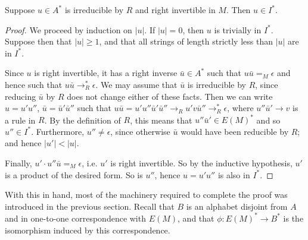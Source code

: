 \documentclass[noindex,noinsetproof,12pt]{lmaths}
\begin{document}
\begin{lemma}
	Suppose $u \in A^*$ is irreducible by $R$ and right invertible in $M$. Then $u \in I^*$. \label{lma:factor-I*}
\end{lemma}
\begin{proof}
	We proceed by induction on $|u|$. If $|u| = 0$, then $u$ is trivially in $I^*$. Suppose then that $|u| \ge 1$, and that all strings of length strictly less than $|u|$ are in $I^*$.

	Since $u$ is right invertible, it has a right inverse $\bar u \in A^*$ such that $u\bar u =_M \epsilon$ and hence such that $u\bar u \to_R^* \epsilon$. We may assume that $\bar u$ is irreducible by $R$, since reducing $\bar u$ by $R$ does not change either of these facts. Then we can write $u = u'u''$, $\bar u = \bar u'\bar u''$ such that $u\bar u = u'u''\bar u'\bar u'' \to_R u'v\bar u'' \to_R^* \epsilon$, where $u''\bar u' \to v$ is a rule in $R$. By the definition of $R$, this means that $u''\bar u' \in E(M)^*$ and so $u'' \in I^*$. Furthermore, $u'' \ne \epsilon$, since otherwise $\bar u$ would have been reducible by $R$; and hence $|u'| < |u|$.

	Finally, $u' \cdot u''\bar u =_M \epsilon$, i.e. $u'$ is right invertible. So by the inductive hypothesis, $u'$ is a product of the desired form. So is $u''$, hence $u = u'u''$ is also in $I^*$.
\end{proof}

With this in hand, most of the machinery required to complete the proof was introduced in the previous section. Recall that $B$ is an alphabet disjoint from $A$ and in one-to-one correspondence with $E(M)$, and that $\phi : E(M)^* \to B^*$ is the isomorphism induced by this correspondence.
\end{document}
